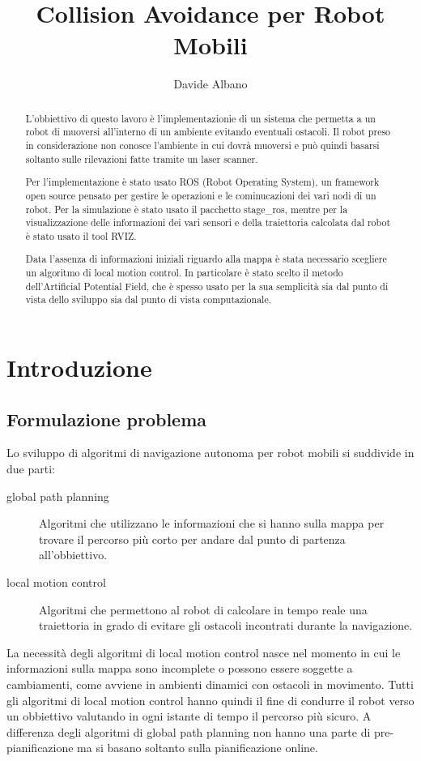 \documentclass[Lau, binding=0.6cm, oneside]{sapthesis}
\title{Collision Avoidance per Robot Mobili}
\author{Davide Albano}
\begin{document}
\maketitle
\begin{abstract}
L'obbiettivo di questo lavoro è l'implementazionie di un sistema che permetta a un robot di muoversi all'interno di un ambiente evitando eventuali ostacoli.
Il robot preso in considerazione non conosce l'ambiente in cui dovrà muoversi e può quindi basarsi soltanto sulle rilevazioni fatte tramite un laser scanner.

Per l'implementazione è stato usato ROS (Robot Operating System), un framework open source pensato per gestire le operazioni e le cominucazioni dei vari nodi di un robot.
Per la simulazione è stato usato il pacchetto stage\_ros, mentre per la visualizzazione delle informazioni dei vari sensori e della traiettoria calcolata dal robot è stato usato il tool RVIZ.

Data l'assenza di informazioni iniziali riguardo alla mappa è stata necessario scegliere un algoritmo di local motion control.
In particolare è stato scelto il metodo dell'Artificial Potential Field, che è spesso usato per la sua semplicità sia dal punto di vista dello sviluppo sia dal punto di vista computazionale.
\end{abstract}
\tableofcontents

\chapter{Introduzione}
\section{Formulazione problema}
Lo sviluppo di algoritmi di navigazione autonoma per robot mobili si suddivide in due parti\cite{fonte1}:
\begin{description}
	\item[global path planning] Algoritmi che utilizzano le informazioni che si hanno sulla mappa per trovare il percorso più corto per andare dal punto di partenza all'obbiettivo.
	\item[local motion control] Algoritmi che permettono al robot di calcolare in tempo reale una traiettoria in grado di evitare gli ostacoli incontrati durante la navigazione.
\end{description}

La necessità degli algoritmi di local motion control nasce nel momento in cui le informazioni sulla mappa sono incomplete o possono essere soggette a cambiamenti, come avviene in ambienti dinamici con ostacoli in movimento.
Tutti gli algoritmi di local motion control hanno quindi il fine di condurre il robot verso un obbiettivo valutando in ogni istante di tempo il percorso più sicuro.
A differenza degli algoritmi di global path planning non hanno una parte di pre-pianificazione ma si basano soltanto sulla pianificazione online.
\end{document}

